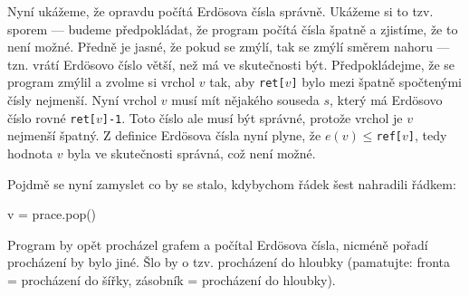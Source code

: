 \documentclass[a4paper,10pt,oneside]{article}
\theoremstyle{definition}
\begin{document}
Nyní ukážeme, že opravdu počítá Erdösova čísla správně. Ukážeme si to tzv. sporem --- budeme předpokládat, že program počítá čísla špatně a zjistíme, že to není
možné. Předně je jasné, že pokud se zmýlí, tak se zmýlí směrem nahoru --- tzn. vrátí Erdösovo číslo větší, než má ve skutečnosti být. Předpokládejme, že
se program zmýlil a zvolme si vrchol $v$ tak, aby {\tt ret[$v$]} bylo mezi špatně spočtenými čísly nejmenší. Nyní vrchol $v$ musí mít nějakého souseda $s$,
který má Erdösovo číslo rovné {\tt ret[$v$]-1}. Toto číslo ale musí být správné, protože vrchol je $v$ nejmenší špatný. Z definice Erdösova čísla nyní plyne,
že $e(v)\leq${\tt ref[$v$]}, tedy hodnota $v$ byla ve skutečnosti správná, což není možné.

Pojdmě se nyní zamyslet co by se stalo, kdybychom řádek šest nahradili řádkem:

\begin{python}
        v = prace.pop()
\end{python}

Program by opět procházel grafem a počítal Erdösova čísla, nicméně pořadí procházení by bylo jiné. Šlo by o tzv. procházení do hloubky (pamatujte:
fronta = procházení do šířky, zásobník = procházení do hloubky). 
\end{document}
